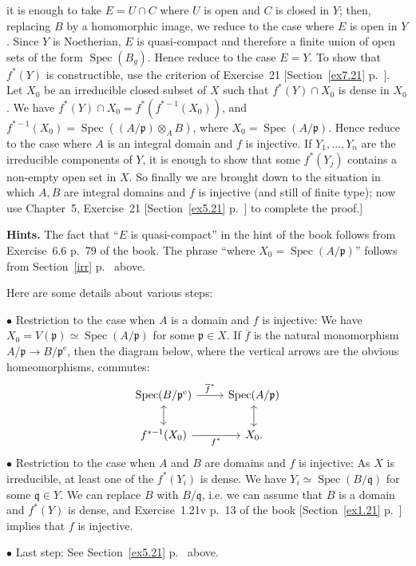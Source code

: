 \documentclass[12pt,letterpaper]{article}%
\newcommand{\oo}{\operatorname}\newcommand{\ooo}{\operatorname*}
\newcommand{\mf}{\mathfrak}
\newcommand{\ppp}{\mf p}
\newcommand{\qqq}{\mf q}
\newcommand{\bu}{\bullet}
\newcommand{\Spec}{\operatorname{Spec}}\newcommand{\Sp}{\operatorname{Spec}}
\newcommand{\nn}{\noindent}
\begin{document}
\nn[By Exercise~20 [Section~\ref{ex7.20} p.~\pageref{ex7.20}] it is enough to take $E=U\cap C$ where $U$ is open and $C$ is closed in $Y$; then, replacing $B$ by a homomorphic image, we reduce to the case where $E$ is open in $Y$. Since $Y$ is Noetherian, $E$ is quasi-compact and therefore a finite union of open sets of the form $\Spec(B_g)$. Hence reduce to the case $E=Y$. To show that $f^*(Y)$ is constructible, use the criterion of Exercise~21 [Section~\ref{ex7.21} p.~\pageref{ex7.20}]. Let $X_0$ be an irreducible closed subset of $X$ such that $f^*(Y)\cap X_0$ is dense in $X_0$. We have $f^*(Y)\cap X_0=f^*(f^{*-1}(X_0))$, and $f^{*-1}(X_0)=\Spec((A/\ppp)\otimes_AB)$, where $X_0=\Spec(A/\ppp)$. Hence reduce to the case where $A$ is an integral domain and $f$ is injective. If $Y_1,\ldots,Y_n$ are the irreducible components of $Y$, it is enough to show that some $f^*(Y_j)$ contains a non-empty open set in $X$. So finally we are brought down to the situation in which $A,B$ are integral domains and $f$ is injective (and still of finite type); now use Chapter~5, Exercise~21 [Section~\ref{ex5.21} p.~\pageref{ex7.20}] to complete the proof.]

\nn\textbf{Hints.} The fact that ``$E$ is quasi-compact'' in the hint of the book follows from Exercise~6.6 p.~79 of the book. The phrase ``where $X_0=\Spec(A/\ppp)$'' follows from Section~\ref{irr} p.~\pageref{irr} above. 

Here are some details about various steps:

\nn$\bu$ Restriction to the case when $A$ is a domain and $f$ is injective: We have $X_0=V(\ppp)\simeq\Spec(A/\ppp)$ for some $\ppp\in X$. If $\overline f$ is the natural monomorphism $A/\ppp\to B/\ppp^{\oo e}$, then the diagram below, where the vertical arrows are the obvious homeomorphisms, commutes: 
$$
\begin{tikzcd}
\Spec(B/\ppp^{\oo e})\ar[r,"\overline f^*"]\ar[d,leftrightarrow]&\Spec(A/\ppp)\ar[d,leftrightarrow]\\ 
f^{*-1}(X_0)\ar[r,"f^*"']&X_0.
\end{tikzcd}
$$ 
\nn$\bu$ Restriction to the case when $A$ and $B$ are domains and $f$ is injective: As $X$ is irreducible, at least one of the $f^*(Y_i)$ is dense. We have $Y_i\simeq\Spec(B/\qqq)$ for some $\qqq\in Y$. We can replace $B$ with $B/\qqq$, i.e. we can assume that $B$ is a domain and $f^*(Y)$ is dense, and Exercise~1.21v p.~13 of the book [Section~\ref{ex1.21} p.~\pageref{ex1.21}] implies that $f$ is injective. 

\nn$\bu$ Last step: See Section~\ref{ex5.21} p.~\pageref{ex5.21} above.
\end{document}
